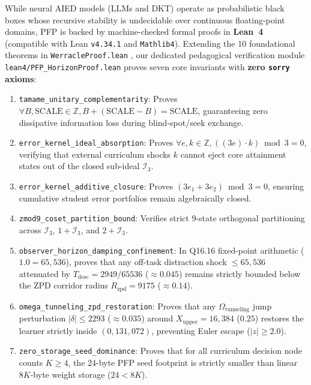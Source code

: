 \documentclass[10pt,twocolumn,a4paper]{article}
\begin{document}
While neural AIED models (LLMs and DKT) operate as probabilistic black boxes whose recursive stability is undecidable over continuous floating-point domains, PFP is backed by machine-checked formal proofs in \textbf{Lean~4} (compatible with Lean \texttt{v4.34.1} and \texttt{Mathlib4}). Extending the 10 foundational theorems in \texttt{WerracleProof.lean} \cite{dagli2026lean4}, our dedicated pedagogical verification module \texttt{lean4/PFP\_HorizonProof.lean} proves seven core invariants with \textbf{zero \texttt{sorry} axioms}:
\begin{enumerate}[leftmargin=*,nosep]
    \item \texttt{tamame\_unitary\_complementarity}: Proves $\forall B, \text{SCALE} \in \mathbb{Z}, B + (\text{SCALE} - B) = \text{SCALE}$, guaranteeing zero dissipative information loss during blind-spot/seek exchange.
    \item \texttt{error\_kernel\_ideal\_absorption}: Proves $\forall e, k \in \mathbb{Z}, ((3e) \cdot k) \bmod 3 = 0$, verifying that external curriculum shocks $k$ cannot eject core attainment states out of the closed sub-ideal $\mathcal{I}_3$.
    \item \texttt{error\_kernel\_additive\_closure}: Proves $(3e_1 + 3e_2) \bmod 3 = 0$, ensuring cumulative student error portfolios remain algebraically closed.
    \item \texttt{zmod9\_coset\_partition\_bound}: Verifies strict 9-state orthogonal partitioning across $\mathcal{I}_3$, $1+\mathcal{I}_3$, and $2+\mathcal{I}_3$.
    \item \texttt{observer\_horizon\_damping\_confinement}: In Q16.16 fixed-point arithmetic ($1.0 = 65,536$), proves that any off-task distraction shock $\le 65,536$ attenuated by $T_{\text{desc}} = 2949/65536$ ($\approx 0.045$) remains strictly bounded below the ZPD corridor radius $R_{\text{zpd}} = 9175$ ($\approx 0.14$).
    \item \texttt{omega\_tunneling\_zpd\_restoration}: Proves that any $\Omega_{\text{tunneling}}$ jump perturbation $|\delta| \le 2293$ ($\approx 0.035$) around $X_{\text{upper}} = 16,384$ ($0.25$) restores the learner strictly inside $(0, 131,072)$, preventing Euler escape ($|z| \ge 2.0$).
    \item \texttt{zero\_storage\_seed\_dominance}: Proves that for all curriculum decision node counts $K \ge 4$, the 24-byte PFP seed footprint is strictly smaller than linear $8K$-byte weight storage ($24 < 8K$).
\end{enumerate}
\end{document}
